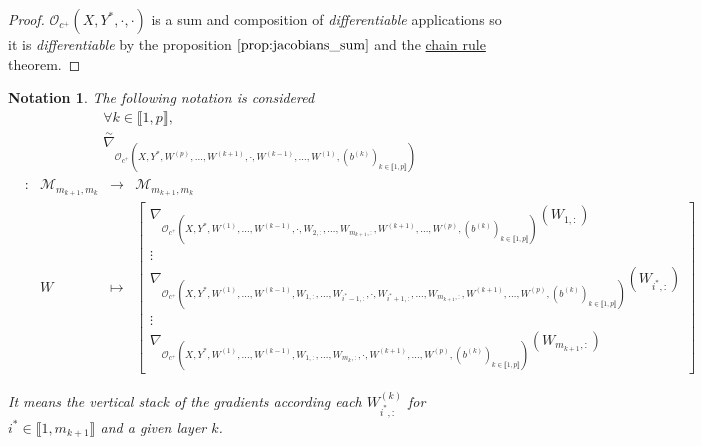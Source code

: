 \documentclass[11pt,en]{elegantpaper}
\newtheorem{notation}{Notation}
\begin{document}
\begin{proof}
  $\mathcal{O}_{c^+}(X,Y^*,\cdot,\cdot)$ is a sum and composition of \textit{differentiable} applications so it is \textit{differentiable} by the proposition $\ref{prop:jacobians_sum}$ and the \hyperref[theo:chain_rule]{chain rule} theorem. \par
\end{proof}

\begin{notation}
  {\normalfont
    The following notation is considered \begin{equation*}
      \begin{gathered}
        \forall k \in \llbracket 1,p \rrbracket, \\
        \overset{\sim}{\nabla}_{\mathcal{O}_{c^+}(X,Y^*,W^{(p)},\ldots,W^{(k+1)},\cdot,W^{(k-1)},\ldots,W^{(1)},(b^{(k)})_{k \in \llbracket 1,p \rrbracket})}
      \end{gathered}
    \end{equation*}
    \begin{equation*}
      \begin{array}{lllll}
          & : & \mathcal{M}_{m_{k+1},m_k} & \longrightarrow & \mathcal{M}_{m_{k+1},m_k} \\
          &   & W & \longmapsto & \begin{bmatrix}
            \nabla_{\mathcal{O}_{c^+}(X,Y^*,W^{(1)},\ldots,W^{(k-1)},\cdot,W_{2,:},\ldots,W_{m_{k+1},:},W^{(k+1)},\ldots,W^{(p)},(b^{(k)})_{k \in \llbracket 1,p \rrbracket})} (W_{1,:}) \\
            \vdots \\
            \nabla_{\mathcal{O}_{c^+}(X,Y^*,W^{(1)},\ldots,W^{(k-1)},W_{1,:},\ldots,W_{i^{*}-1,:},\cdot,W_{i^{*}+1,:},\ldots,W_{m_{k+1},:},W^{(k+1)},\ldots,W^{(p)},(b^{(k)})_{k \in \llbracket 1,p \rrbracket})} (W_{i^{*},:}) \\
            \vdots \\
            \nabla_{\mathcal{O}_{c^+}(X,Y^*,W^{(1)},\ldots,W^{(k-1)},W_{1,:},\ldots,W_{m_{k},:},\cdot,W^{(k+1)},\ldots,W^{(p)},(b^{(k)})_{k \in \llbracket 1,p \rrbracket})} (W_{m_{k+1},:})
          \end{bmatrix}
      \end{array}
    \end{equation*} \par

    It means the vertical stack of the gradients according each $W^{(k)}_{i^{*},:}$
    for $i^{*} \in \llbracket 1,m_{k+1} \rrbracket$ and a given layer $k$. \par
  }
\end{notation}
\end{document}
